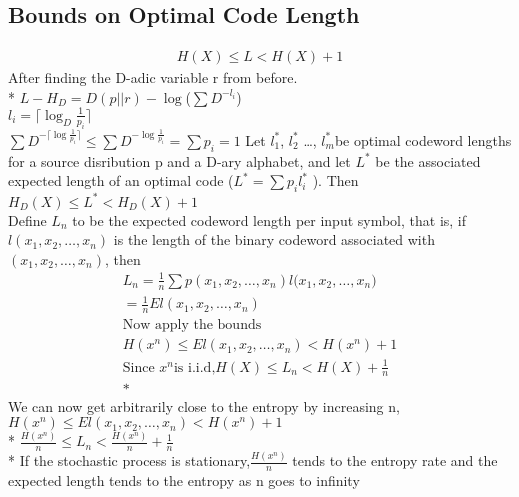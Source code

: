 \documentclass[10pt]{article}
\begin{document}
\begin{tiny}
\begin{multicols}{3}



\section*{Bounds on Optimal Code Length}
\begin{eqnarray*}
H(X) \leq L < H(X) + 1
\end{eqnarray*}
After finding the D-adic variable r from before. \\*
$L-H_D = D(p||r) - \log $($\sum D^{-l_i}$) \\
${l_i} = \lceil{\log_D \frac {1}{p_i}} \rceil$ \\
$\sum D^{- \lceil \log \frac {1}{p_i}\rceil}\leq\sum D^{- \log\frac{1}{p_i}}=\sum {p_i}=1$ 
 \label{thm:optimum codewords}
Let ${l_1^{*}}$, ${l_2^{*}}$ \ldots , ${l_m^{*}}$be optimal codeword lengths for a
source disribution p and a D-ary alphabet, and let ${L^{*}}$ be the associated
expected length of an optimal code (${L^{*}}=\sum{p_i}{l_i^{*}}$ ). Then \\
${H_D(X)}\leq L^{*}<{H_D(X)}+1$ \\
Define ${L_n}$ to be the expected codeword length per input symbol, that is,
if ${l(x_1,x_2, \ldots ,x_n)}$ is the length of the binary codeword associated with
${(x_1,x_2, \ldots ,x_n)}$, then \newline
\begin{eqnarray*}
{L_n} = \frac {1}{n}\sum{p(x_1,x_2, \ldots ,x_n)}{l(x_1,x_2, \ldots ,x_n})\\
= \frac{1}{n}El(x_1,x_2, \ldots ,x_n)\\
\text{Now apply the bounds}\\
{H(x^{n})} \leq El(x_1,x_2, \ldots ,x_n) < {H(x^{n})} + 1 \\
\text{Since } {x^{n}} \text{is i.i.d,} {H(X)} \leq {L_n} < {H(X)} + \frac{1}{n} \\*
\end{eqnarray*}
We can now get arbitrarily close to the entropy by increasing n, \newline
${H(x^{n})} \leq El(x_1,x_2, \ldots ,x_n) < {H(x^{n})} + 1$ \\*
$\frac{H(x^{n})}{n}\leq {L_n}<\frac{H(x^{n})}{n}+\frac{1}{n}$ \\*
If the stochastic process is stationary,$\frac{H(x^{n})}{n}$ tends to the entropy rate \newline
and the expected length tends to the entropy as n goes to infinity \\

\end{multicols}
\end{tiny}
\end{document}
